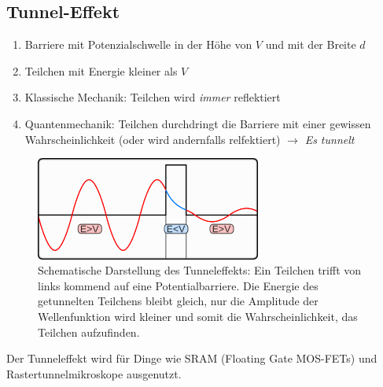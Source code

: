 \documentclass{article}
\begin{document}
\subsection{Tunnel-Effekt }\label{k1:tunnEf}
\begin{enumerate}
    \item Barriere mit Potenzialschwelle in der Höhe von $V$ und mit der Breite $d$
    \item Teilchen mit Energie kleiner als $V$
    \item Klassische Mechanik: Teilchen wird \textit{immer} reflektiert
    \item Quantenmechanik: Teilchen durchdringt die Barriere mit einer gewissen Wahrscheinlichkeit (oder wird andernfalls relfektiert) $\rightarrow$ \textit{Es tunnelt}
\end{enumerate}
\begin{figure}
    \centering
    \includegraphics[width=0.66\textwidth]{fig/tunneleffektwiki.png}
    \caption{Schematische Darstellung des Tunneleffekts:
Ein Teilchen trifft von links kommend auf eine Potentialbarriere. Die Energie des getunnelten Teilchens bleibt gleich, nur die Amplitude der Wellenfunktion wird kleiner und somit die Wahrscheinlichkeit, das Teilchen aufzufinden.}
    \label{fig:tunneleffekt}
\end{figure}

Der Tunneleffekt wird für Dinge wie SRAM (Floating Gate MOS-FETs) und Rastertunnelmikroskope ausgenutzt. 
\end{document}
